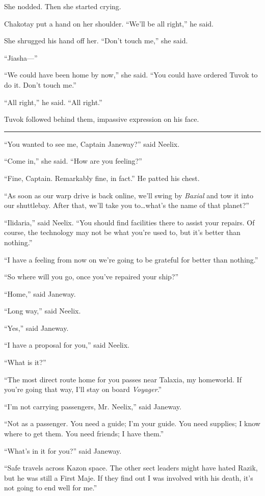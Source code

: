 \documentclass[twoside,letterpaper,12pt]{memoir}
\begin{document}
She nodded. Then she started crying. 

Chakotay put a hand on her shoulder. ``We’ll be all right,'' he said. 

She shrugged his hand off her. ``Don’t touch me,'' she said. 

``Jiasha---'' 

``We could have been home by now,'' she said. ``You could have ordered Tuvok to do it. Don’t touch me.'' 

``All right,'' he said. ``All right.'' 

Tuvok followed behind them, impassive expression on his face. 

\fancybreak{\rule{3cm}{0.4 pt}} 

``You wanted to see me, Captain Janeway?'' said Neelix. 

``Come in,'' she said. ``How are you feeling?'' 

``Fine, Captain. Remarkably fine, in fact.'' He patted his chest. 

``As soon as our warp drive is back online, we’ll swing by \textit{Baxial} and tow it into our shuttlebay. After that, we’ll take you to\ldots what’s the name of that planet?'' 

``Ilidaria,'' said Neelix. ``You should find facilities there to assist your repairs. Of course, the technology may not be what you’re used to, but it’s better than nothing.'' 

``I have a feeling from now on we’re going to be grateful for better than nothing.'' 

``So where will you go, once you’ve repaired your ship?'' 

``Home,'' said Janeway. 

``Long way,'' said Neelix. 

``Yes,'' said Janeway.

``I have a proposal for you,'' said Neelix. 

``What is it?'' 

``The most direct route home for you passes near Talaxia, my homeworld. If you’re going that way, I’ll stay on board \textit{Voyager}.'' 

``I’m not carrying passengers, Mr. Neelix,'' said Janeway. 

``Not as a passenger. You need a guide; I’m your guide. You need supplies; I know where to get them. You need friends; I have them.'' 

``What’s in it for you?'' said Janeway. 

``Safe travels across Kazon space. The other sect leaders might have hated Razik, but he was still a First Maje. If they find out I was involved with his death, it’s not going to end well for me.'' 
\end{document}
